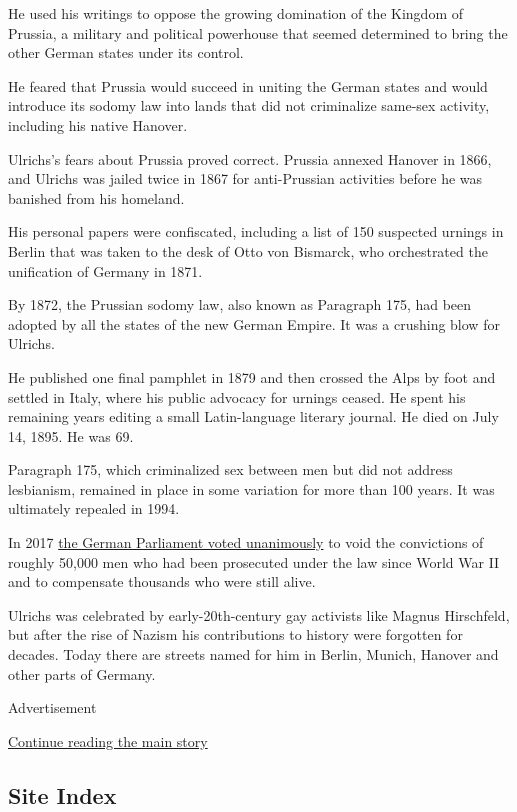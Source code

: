 He used his writings to oppose the growing domination of the Kingdom of
Prussia, a military and political powerhouse that seemed determined to
bring the other German states under its control.

He feared that Prussia would succeed in uniting the German states and
would introduce its sodomy law into lands that did not criminalize
same-sex activity, including his native Hanover.

Ulrichs's fears about Prussia proved correct. Prussia annexed Hanover in
1866, and Ulrichs was jailed twice in 1867 for anti-Prussian activities
before he was banished from his homeland.

His personal papers were confiscated, including a list of 150 suspected
urnings in Berlin that was taken to the desk of Otto von Bismarck, who
orchestrated the unification of Germany in 1871.

By 1872, the Prussian sodomy law, also known as Paragraph 175, had been
adopted by all the states of the new German Empire. It was a crushing
blow for Ulrichs.

He published one final pamphlet in 1879 and then crossed the Alps by
foot and settled in Italy, where his public advocacy for urnings ceased.
He spent his remaining years editing a small Latin-language literary
journal. He died on July 14, 1895. He was 69.

Paragraph 175, which criminalized sex between men but did not address
lesbianism, remained in place in some variation for more than 100 years.
It was ultimately repealed in 1994.

In 2017
\href{https://www.nytimes.com/2017/06/23/world/europe/germany-anti-gay-law.html}{the
German Parliament voted unanimously} to void the convictions of roughly
50,000 men who had been prosecuted under the law since World War II and
to compensate thousands who were still alive.

Ulrichs was celebrated by early-20th-century gay activists like Magnus
Hirschfeld, but after the rise of Nazism his contributions to history
were forgotten for decades. Today there are streets named for him in
Berlin, Munich, Hanover and other parts of Germany.

Advertisement

\protect\hyperlink{after-bottom}{Continue reading the main story}

\hypertarget{site-index}{%
\subsection{Site Index}\label{site-index}}


